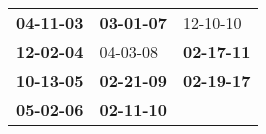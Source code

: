 \begin{supertabular}{p{0.33\columnwidth}p{0.33\columnwidth}p{0.33\columnwidth}}
 \textbf{04-11-03\textsuperscript{}} &  \textbf{03-01-07\textsuperscript{}} &           12-10-10\textsuperscript{} \\
 \textbf{12-02-04\textsuperscript{}} &           04-03-08\textsuperscript{} &  \textbf{02-17-11\textsuperscript{}} \\
 \textbf{10-13-05\textsuperscript{}} &  \textbf{02-21-09\textsuperscript{}} &  \textbf{02-19-17\textsuperscript{}} \\
 \textbf{05-02-06\textsuperscript{}} &  \textbf{02-11-10\textsuperscript{}} &                                      \\
\end{supertabular}
